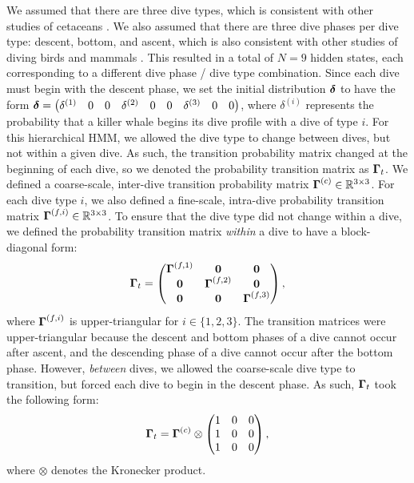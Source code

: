 We assumed that there are three dive types, which is consistent with other studies of cetaceans \citep[e.g.][]{Barajas:2017}. We also assumed that there are three dive phases per dive type: descent, bottom, and ascent, which is also consistent with other studies of diving birds and mammals \citep[e.g.][]{Vivant:2014}. This resulted in a total of $N = 9$ hidden states, each corresponding to a different dive phase / dive type combination.
%
Since each dive must begin with the descent phase, we set the initial distribution $\boldsymbol{\delta}$ to have the form
%
    $\boldsymbol{\delta} = \begin{pmatrix} \delta^{(1)} & 0 & 0 & \delta^{(2)} & 0 & 0 & \delta^{(3)} & 0 & 0 \end{pmatrix}$,
%
where $\delta^{(i)}$ represents the probability that a killer whale begins its dive profile with a dive of type $i$. 
%
For this hierarchical HMM, we allowed the dive type to change between dives, but not within a given dive. As such, the transition probability matrix changed at the beginning of each dive, so we denoted the probability transition matrix as $\boldsymbol{\Gamma}_t$. We defined a coarse-scale, inter-dive transition probability matrix $\boldsymbol{\Gamma}^{(c)} \in \mathbb{R}^{3 \times 3}$. For each dive type $i$, we also defined a fine-scale, intra-dive probability transition matrix $\boldsymbol{\Gamma}^{(f,i)} \in \mathbb{R}^{3 \times 3}$. 
%
To ensure that the dive type did not change within a dive, we defined the probability transition matrix \textit{within} a dive to have a block-diagonal form:
%
\begin{equation}
    \boldsymbol{\Gamma}_t = 
    \begin{pmatrix}
        \boldsymbol{\Gamma}^{(f,1)} & \mathbf{0} & \mathbf{0} \\
        \mathbf{0} & \boldsymbol{\Gamma}^{(f,2)} & \mathbf{0} \\
        \mathbf{0} & \mathbf{0} & \boldsymbol{\Gamma}^{(f,3)} \\
    \end{pmatrix},
\end{equation}
%
where $\boldsymbol{\Gamma}^{(f,i)}$ is upper-triangular for $i \in \{1,2,3\}$. The transition matrices were upper-triangular because the descent and bottom phases of a dive cannot occur after ascent, and the descending phase of a dive cannot occur after the bottom phase.
%
However, \textit{between} dives, we allowed the coarse-scale dive type to transition, but forced each dive to begin in the descent phase. As such, $\boldsymbol{\Gamma}_t$ took the following form:
%
\begin{equation}
    \boldsymbol{\Gamma}_t = \boldsymbol{\Gamma}^{(c)} \otimes \begin{pmatrix} 1 & 0 & 0 \\ 1 & 0 & 0 \\ 1 & 0 & 0 \end{pmatrix},
\end{equation}
%
where $\otimes$ denotes the Kronecker product.

